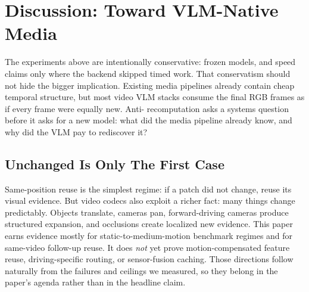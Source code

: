 \section{Discussion: Toward VLM-Native Media}

The experiments above are intentionally conservative: frozen models, and speed
claims only where the backend skipped timed work.
That conservatism should not hide the bigger implication. Existing media
pipelines already contain cheap temporal structure, but most video VLM stacks
consume the final RGB frames as if every frame were equally new. Anti-
recomputation asks a systems question before it asks for a new model: what did
the media pipeline already know, and why did the VLM pay to rediscover it?

\subsection{Unchanged Is Only The First Case}

Same-position reuse is the simplest regime: if a patch did not change, reuse
its visual evidence. But video codecs also exploit a richer fact: many things
change predictably. Objects translate, cameras pan, forward-driving cameras
produce structured expansion, and occlusions create localized new evidence.
This paper earns evidence mostly for static-to-medium-motion benchmark
regimes and for same-video follow-up reuse. It does \emph{not} yet prove
motion-compensated feature reuse, driving-specific routing, or sensor-fusion
caching. Those directions follow naturally from the failures and ceilings we
measured, so they belong in the paper's agenda rather than in the headline
claim.

